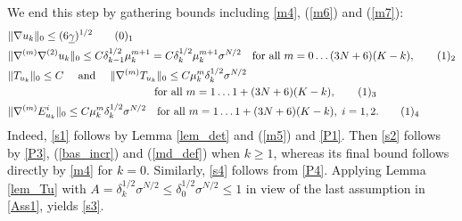 \documentclass[reqno,twoside,11pt]{amsart}
\numberwithin{equation}{section}
\theoremstyle{plain}
\theoremstyle{definition}
\begin{document}
We end this step by gathering bounds including \ref{m4}, (\ref{m6}) and (\ref{m7}):
\begin{align*}
& \|\nabla u_k\|_0\leq (6\underline\gamma)^{1/2}
\tag*{(\theequation)$_1$}\refstepcounter{equation} \label{s1} \\
& \|\nabla^{(m)}\nabla^{(2)} u_ k\|_0\leq C\delta_{k-1}^{1/2}\mu_k^{m+1}=
C\delta_{k}^{1/2}\mu_k^{m+1}\sigma^{N/2} \quad\mbox{for all } m=0\ldots (3N+6)(K-k),
\tag*{(\theequation)$_2$} \label{s2} \\
& \|T_{u_k}\|_0\leq C \quad\mbox{ and }\quad
\|\nabla^{(m)}T_{u_k}\|_0\leq C\mu_k^m\delta_k^{1/2}\sigma^{N/2}\\
& \qquad \qquad\qquad \qquad \qquad\qquad \; \,\quad\mbox{for all } m=1\ldots 1+ (3N+6)(K-k), 
\tag*{(\theequation)$_3$} \label{s3} \\
& \|\nabla^{(m)}E^i_{u_k}\|_0\leq
C\mu_k^m\delta_k^{1/2}\sigma^{N/2}\quad\mbox{for all } m=1\ldots 1+ (3N+6)(K-k),\;i=1,2. 
\tag*{(\theequation)$_4$} \label{s4} 
\end{align*}
Indeed, \ref{s1} follows by Lemma \ref{lem_det} and (\ref{m5}) and \ref{P1}. Then \ref{s2} follows by
\ref{P3}, (\ref{bas_incr}) and (\ref{md_def})
when $k\geq 1$, whereas its final bound follows directly by
\ref{m4} for $k=0$. Similarly, \ref{s4} follows from \ref{P4}.
Applying Lemma \ref{lem_Tu} with
$A=\delta_k^{1/2}\sigma^{N/2}\leq \delta_0^{1/2}\sigma^{N/2}\leq 1$ in
view of the last assumption in \ref{Ass1}, yields \ref{s3}. 

\smallskip
\end{document}
